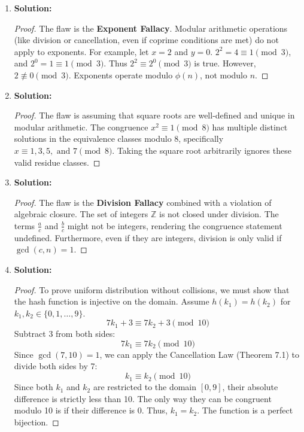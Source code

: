 \documentclass{article}
\begin{document}
\begin{enumerate}
    \item \textbf{Solution:}
    \begin{proof}
        The flaw is the \textbf{Exponent Fallacy}. Modular arithmetic operations (like division or cancellation, even if coprime conditions are met) do not apply to exponents. For example, let $x = 2$ and $y = 0$. $2^2 = 4 \equiv 1 \pmod 3$, and $2^0 = 1 \equiv 1 \pmod 3$. Thus $2^2 \equiv 2^0 \pmod 3$ is true. However, $2 \not\equiv 0 \pmod 3$. Exponents operate modulo $\phi(n)$, not modulo $n$.
    \end{proof}

    \item \textbf{Solution:}
    \begin{proof}
        The flaw is assuming that square roots are well-defined and unique in modular arithmetic. The congruence $x^2 \equiv 1 \pmod 8$ has multiple distinct solutions in the equivalence classes modulo 8, specifically $x \equiv 1, 3, 5, \text{ and } 7 \pmod 8$. Taking the square root arbitrarily ignores these valid residue classes.
    \end{proof}

    \item \textbf{Solution:}
    \begin{proof}
        The flaw is the \textbf{Division Fallacy} combined with a violation of algebraic closure. The set of integers $\mathbb{Z}$ is not closed under division. The terms $\frac{a}{c}$ and $\frac{b}{c}$ might not be integers, rendering the congruence statement undefined. Furthermore, even if they are integers, division is only valid if $\gcd(c, n) = 1$.
    \end{proof}

    \item \textbf{Solution:}
    \begin{proof}
        To prove uniform distribution without collisions, we must show that the hash function is injective on the domain. Assume $h(k_1) = h(k_2)$ for $k_1, k_2 \in \{0, 1, \dots, 9\}$.
        \[ 7k_1 + 3 \equiv 7k_2 + 3 \pmod{10} \]
        Subtract 3 from both sides:
        \[ 7k_1 \equiv 7k_2 \pmod{10} \]
        Since $\gcd(7, 10) = 1$, we can apply the Cancellation Law (Theorem 7.1) to divide both sides by 7:
        \[ k_1 \equiv k_2 \pmod{10} \]
        Since both $k_1$ and $k_2$ are restricted to the domain $[0, 9]$, their absolute difference is strictly less than 10. The only way they can be congruent modulo 10 is if their difference is 0. Thus, $k_1 = k_2$. The function is a perfect bijection.
        

\end{proof}
\end{enumerate}
\end{document}
